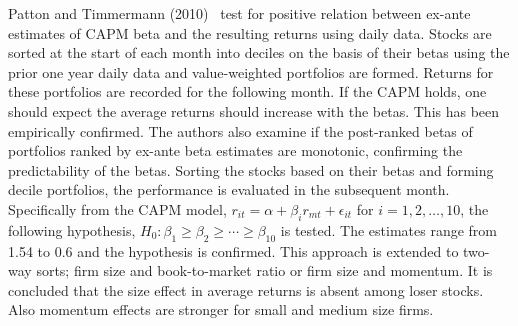 Patton and Timmermann (2010)~\cite{pattim} test for positive relation between ex-ante estimates of CAPM beta and the resulting returns using daily data. Stocks are sorted at the start of each month into deciles on the basis of their betas using the prior one year daily data and value-weighted portfolios are formed. Returns for these portfolios are recorded for the following month. If the CAPM holds, one should expect the average returns should increase with the betas. This has been empirically confirmed. The authors also examine if the post-ranked betas of portfolios ranked by ex-ante beta estimates are monotonic, confirming the predictability of the betas. Sorting the stocks based on their betas and forming decile portfolios, the performance is evaluated in the subsequent month. Specifically from the CAPM model, $r_{it}= \alpha + \beta_i r_{mt} + \epsilon_{it}$ for $i= 1, 2, \ldots, 10$, the following hypothesis, $H_0: \beta_1 \geq \beta_2 \geq \cdots \geq \beta_{10}$ is tested. The estimates range from 1.54 to 0.6 and the hypothesis is confirmed. This approach is extended to two-way sorts; firm size and book-to-market ratio or firm size and momentum. It is concluded that the size effect in average returns is absent among loser stocks. Also momentum effects are stronger for small and medium size firms. \twomedskip


